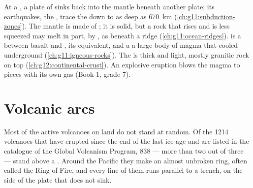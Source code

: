 \begin{recall}
At a , a plate of  sinks back into the
mantle beneath another plate; its earthquakes, the ,
trace the  down to as deep as \qty{670}{km}
(\cref{ch:g11:subduction-zones}). The mantle is made of ; it is
solid, but a rock that rises and is less squeezed may melt in part, by
, as beneath a ridge (\cref{ch:g11:ocean-ridges}).
 is a  between basalt and ,  its 
equivalent, and a  a large body of magma that cooled underground
(\cref{ch:g11:igneous-rocks}). The  is thick and light,
mostly granitic rock on top (\cref{ch:g12:continental-crust}). An explosive
eruption blows the magma to pieces with its own gas (Book 1, grade 7).
\end{recall}

\section{Volcanic arcs}

Most of the active volcanoes on land do not stand at random. Of the 1214
volcanoes that have erupted since the end of the last ice age and are listed
in the catalogue of the Global Volcanism Program, 838 --- more than two out
of three --- stand above a . Around the Pacific they make an
almost unbroken ring, often called the Ring of Fire, and every line of them
runs parallel to a trench, on the side of the plate that does not sink.

